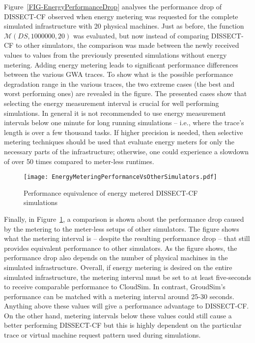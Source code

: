 \documentclass[sort, compress, 5p]{elsarticle}
\begin{document}
Figure~\ref{FIG-EnergyPerformanceDrop} analyses the performance drop of DISSECT-CF observed when energy metering was requested for the complete simulated infrastructure with 20 physical machines. Just as before, the function $\mathcal{M}(DS, 1000000, 20)$ was evaluated, but now instead of comparing DISSECT-CF to other simulators, the comparison was made between the newly received values to values from the previously presented simulations without energy metering. Adding energy metering leads to significant performance differences between the various GWA traces. To show what is the possible performance degradation range in the various traces, the two extreme cases (the best and worst performing ones) are revealed in the figure. The presented cases show that selecting the energy measurement interval is crucial for well performing simulations. In general it is not recommended to use energy measurement intervals below one minute for long running simulations -- i.e., where the trace's length is over a few thousand tasks. If higher precision is needed, then selective metering techniques should be used that evaluate energy meters for only the necessary parts of the infrastructure; otherwise, one could experience a slowdown of over 50 times compared to meter-less runtimes.

\begin{figure}[tb]
\texttt{[image: EnergyMeteringPerformanceVsOtherSimulators.pdf]}
\caption{Performance equivalence of energy metered DISSECT-CF simulations\label{FIG-EnergyEquivalence}}
\end{figure}
Finally, in Figure~\ref{FIG-EnergyEquivalence}, a comparison is shown about the performance drop caused by the metering to the meter-less setups of other simulators. The figure shows what the metering interval is -- despite the resulting performance drop -- that still provides equivalent performance to other simulators. As the figure shows, the performance drop also depends on the number of physical machines in the simulated infrastructure. Overall, if energy metering is desired on the entire simulated infrastructure, the metering interval must be set to at least five-seconds to receive comparable performance to CloudSim. In contrast, GroudSim's performance can be matched with a metering interval around 25-30 seconds. Anything above these values will give a performance advantage to DISSECT-CF. On the other hand, metering intervals below these values could still cause a better performing DISSECT-CF but this is highly dependent on the particular trace or virtual machine request pattern used during simulations.
\end{document}
